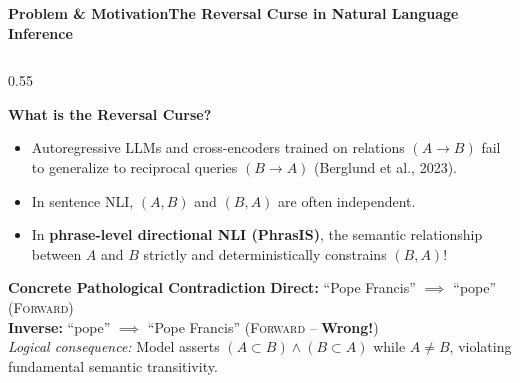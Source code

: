 \documentclass[aspectratio=169,10pt]{beamer}
\begin{document}
\begin{frame}{\textbf{Problem \& Motivation}}{\textbf{The Reversal Curse in Natural Language Inference}}
  \begin{columns}[T]
    \begin{column}{0.55\textwidth}
      \begin{block}{\textbf{What is the Reversal Curse?}}
        \small
        \begin{itemize}
          \item Autoregressive LLMs and cross-encoders trained on relations $(A \to B)$ fail to generalize to reciprocal queries $(B \to A)$ (Berglund et al., 2023).
          \item In sentence NLI, $(A, B)$ and $(B, A)$ are often independent.
          \item In \textbf{phrase-level directional NLI (PhrasIS)}, the semantic relationship between $A$ and $B$ strictly and deterministically constrains $(B, A)$!
        \end{itemize}
      \end{block}
      \vspace{0.1cm}
      \begin{alertblock}{\textbf{Concrete Pathological Contradiction}}
        \small
        \textbf{Direct:} ``Pope Francis'' $\implies$ ``pope'' \quad (\textsc{Forward}) \\
        \textbf{Inverse:} ``pope'' $\implies$ ``Pope Francis'' \quad (\textsc{Forward} -- \textbf{Wrong!}) \\
        \textit{Logical consequence:} Model asserts $(A \subset B) \land (B \subset A)$ while $A \neq B$, violating fundamental semantic transitivity.
      \end{alertblock}
    \end{column}


\end{columns}
\end{frame}
\end{document}
